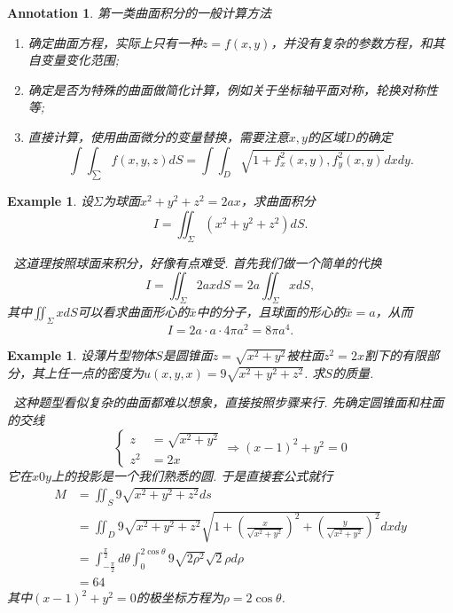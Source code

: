 \documentclass{article}
\newtheorem{example}[theorem]{Example}
\newtheorem{annotation}[theorem]{Annotation}
\newcommand{\hints}{{\color{blue} \text{hints}}}
\begin{document}
\begin{annotation}
\rm 第一类曲面积分的一般计算方法
\begin{enumerate}
	\item 确定曲面方程，实际上只有一种$z=f(x,y)$，并没有复杂的参数方程，和其自变量变化范围; 
	\item 确定是否为特殊的曲面做简化计算，例如关于坐标轴平面对称，轮换对称性等;
	\item 直接计算，使用曲面微分的变量替换，需要注意$x,y$的区域$D$的确定
	$$
\int\int_\sum f(x,y,z)dS = \int\int_D\sqrt{1+f_x^2(x,y),f_y^2(x,y)}dxdy.
$$
\end{enumerate}
\end{annotation}

\begin{example}
\rm 设$\Sigma$为球面$x^2 + y^2 + z^2 = 2ax$，求曲面积分
$$
I =\iint_{\Sigma} (x^2 + y^2 + z^2)dS.
$$

\hints\ 这道理按照球面来积分，好像有点难受. 首先我们做一个简单的代换
$$
I = \iint_{\Sigma} 2ax dS = 2a \iint_{\Sigma} xdS,
$$
其中$\iint_{\Sigma} xdS$可以看求曲面形心的$\bar{x}$中的分子，且球面的形心的$\bar{x} = a$，从而
$$
I = 2a \cdot a \cdot 4\pi a^2 = 8\pi a^4. 
$$
\end{example}

\begin{example}
\rm 设薄片型物体$S$是圆锥面$z=\sqrt{x^2+y^2}$被柱面$z^2 = 2x$割下的有限部分，其上任一点的密度为$u(x,y,x)=9\sqrt{x^2 + y^2 + z^2}$. 求$S$的质量. 

\hints\ 这种题型看似复杂的曲面都难以想象，直接按照步骤来行. 先确定圆锥面和柱面的交线
$$
\left\{
\begin{aligned}
z&=\sqrt{x^2+y^2} \\
z^2 &= 2x
\end{aligned} \right.  \Rightarrow 
(x-1)^2 + y^2 = 0
$$
它在$x0y$上的投影是一个我们熟悉的圆. 于是直接套公式就行
$$
\begin{aligned}
M &= \iint_S 9\sqrt{x^2 + y^2 + z^2}ds \\
 &=  \iint_D 9\sqrt{x^2 + y^2 + z^2}\sqrt{1 + \left(\frac{x}{\sqrt{x^2 + y^2}}\right)^2 + \left(\frac{y}{\sqrt{x^2 + y^2}}\right)^2}dxdy \\
 &= \int_{-\frac{\pi}{2}}^{\frac{\pi}{2}}d\theta \int_0^{2\cos\theta} 9\sqrt{2\rho^2}\sqrt{2} \rho d\rho \\
 &= 64 
\end{aligned}
$$
其中$(x-1)^2 + y^2=0$的极坐标方程为$\rho = 2\cos\theta$. 
\end{example}
\end{document}
